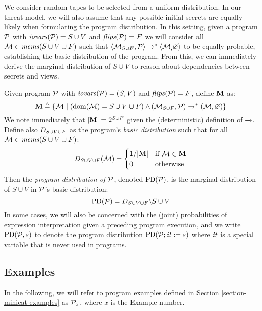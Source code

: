 We consider random tapes to be selected from a uniform distribution.
In our threat model, we will also assume that any possible initial
secrets are equally likely when formulating the program distribution.
In this setting, given a program $\mathcal{P}$ with $\mathit{iovars}(\mathcal{P}) = S \cup
V$ and $\mathit{flips}(\mathcal{P}) = F$ we will consider all $\mathcal{M}
\in \mathit{mems}(S \cup V \cup F)$ such that
$
\langle \mathcal{M}_{S \cup F},\mathcal{P} \rangle \xrightarrow{}^{*} \langle \mathcal{M}_,\varnothing \rangle
$
to be equally probable, establishing the basic distribution of the
program. From this, we can immediately derive the marginal distribution
of $S \cup V$ to reason about dependencies between secrets and views. 
\begin{definition}
  \label{def-progd}
  Given program $\mathcal{P}$ with $\mathit{iovars}(\mathcal{P}) = (S,V)$ and $\mathit{flips}(\mathcal{P}) = F$, define $\mathbf{M}$ as:
  $$
  \mathbf{M} \triangleq \{ \mathcal{M} \mid (\mathrm{dom}(\mathcal{M}) = S \cup V \cup F) \wedge (\mathcal{M}_{S \cup F},\mathcal{P}) \xrightarrow{}^{*} (\mathcal{M},\varnothing) \}
  $$
  We note immediately that $|\mathbf{M}| = 2^{S \cup F}$ given the (deterministic) definition of $\xrightarrow{}$. 
  Define also $D_{S \cup V \cup F}$ as the program's \emph{basic distribution} such that for all
  $\mathcal{M} \in \mathit{mems}(S \cup V \cup F)$:
  $$
  D_{S \cup V \cup F}(\mathcal{M}) =
  \begin{cases}
    1 / |\mathbf{M}| & \text{if}\ \mathcal{M} \in \mathbf{M}\\
    0 & \text{otherwise}
  \end{cases}
  $$
  Then the \emph{program distribution of $\mathcal{P}$}, denoted $\mathrm{PD}(\mathcal{P})$, is the
  marginal distribution of $S \cup V$ in $\mathcal{P}$'s basic distribution:
  $$
  \mathrm{PD}(\mathcal{P}) =  D_{S \cup V \cup F}\backslash S\cup V
  $$
  In some cases, we will also be concerned with the (joint)
  probabilities of expression interpretation given a preceding program
  execution, and we write $\mathrm{PD}(\mathcal{P}, \varepsilon)$ to denote the program
  distribution $\mathrm{PD}(\mathcal{P};\mathit{it} := \varepsilon)$ where $\mathit{it}$ is a
  special variable that is never used in programs.
\end{definition}


\subsection{Examples}
\label{section-pmf-examples}

In the following, we will refer to program examples defined in
Section \ref{section-minicat-examples} as $\mathcal{P}_x$, where $x$
is the Example number. 

